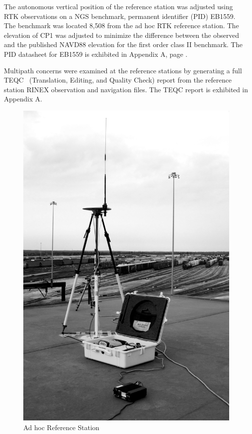 The autonomous vertical position of the reference station was adjusted using RTK observations on a NGS benchmark, permanent identifier (PID) EB1559. The benchmark was located 8,508 from the ad hoc RTK reference station. The elevation of CP1 was adjusted to minimize the difference between the observed and the published NAVD88 elevation for the first order class II benchmark. The PID datasheet for EB1559 is exhibited in Appendix A, page \pageref{EB1559}.

Multipath concerns were examined at the reference stations by generating a full TEQC~\citep{EsteyTEQC} (Translation, Editing, and Quality Check) report from the reference station RINEX observation and navigation files. The TEQC report is exhibited in Appendix A.

\begin{figure}[!h]
\begin{center}
	\includegraphics[scale=0.5]{graphics/AhRS_hamlet_BW}
	\caption{Ad hoc Reference Station}
	\label{fig:AhRS}
\end{center}
\end{figure}

